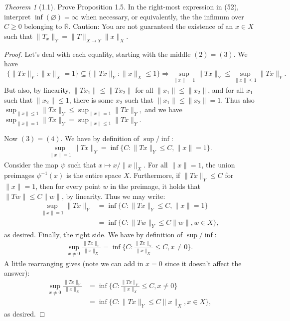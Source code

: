 \documentclass[12pt]{article}
\theoremstyle{remark}
\theoremstyle{named}
\newtheorem*{theorem}{Theorem}
\newcommand{\R}{\mathbb R}
\renewcommand{\implies}{\Rightarrow}
\begin{document}
\begin{theorem}[1.1]
    Prove Proposition 1.5. In the right-most expression in (52), interpret \(\inf(\varnothing) = \infty\) when necessary, or equivalently, the the infimum over \(C \geq 0\) belonging to \(\overline{\R}\). Caution: You are not guaranteed the existence of an \(x \in X\) such that \(\|T_x\|_Y = \|T\|_{X \to Y}\|x\|_X\).
\end{theorem}

\begin{proof}
    Let's deal with each equality, starting with the middle \((2) = (3)\). We have
    \begin{align*}
        \{\|T x\|_Y : \|x\|_X = 1\} \subseteq \{\|T x\|_Y : \|x\|_X \leq 1\} \implies \sup_{\|x\| = 1} \|T x\|_Y \leq \sup_{\|x\| \leq 1} \|T x\|_Y.
    \end{align*}
    But also, by linearity, \(\|Tx_1\| \leq \|Tx_2\|\) for all \(\|x_1\| \leq \|x_2\|\), and for all \(x_1\) such that \(\|x_2\| \leq 1\), there is some \(x_2\) such that \(\|x_1\| \leq \|x_2\| = 1\). Thus also \(\sup_{\|x\| \leq 1} \|T x\|_Y \leq \sup_{\|x\| = 1} \|T x\|_Y,\) and we have
    \(\sup_{\|x\| = 1} \|T x\|_Y = \sup_{\|x\| \leq 1} \|T x\|_Y.\)

    Now \((3) = (4)\). We have by definition of \(\sup / \inf\):
    \begin{align*}
        \sup_{\|x\| = 1} \|T x\|_Y = \inf \{C : \|T x\|_Y \leq C, \|x\| = 1\}.
    \end{align*}
    Consider the map \(\psi\) such that \(x \mapsto x / \|x\|_X\). For all \(\|x\| = 1\), the union preimages \(\psi^{-1}(x)\) is the entire space \(X\). Furthermore, if \(\|T x\|_Y \leq C\) for \(\|x\| = 1\), then for every point \(w\) in the preimage, it holds that \(\|T w\| \leq C \|w\|\), by linearity. Thus we may write:
    \begin{align*}
        \sup_{\|x\| = 1} \|T x\|_Y &= \inf \{C : \|T x\|_Y \leq C, \|x\| = 1\} \\
        &= \inf \{C : \|T w\|_Y \leq C \|w\|, w \in X\},
    \end{align*}
    as desired.
    Finally, the right side. We have by definition of \(\sup / \inf\):
    \begin{align*}
        \sup_{x \neq 0} \frac{\|T x\|_Y}{\|x\|_X} = \inf \{C : \frac{\|T x\|_Y}{\|x\|_X} \leq C, x \neq 0\}.
    \end{align*}
    A little rearranging gives (note we can add in \(x = 0\) since it doesn't affect the answer):
    \begin{align*}
        \sup_{x \neq 0} \frac{\|T x\|_Y}{\|x\|_X} &= \inf \{C : \frac{\|T x\|_Y}{\|x\|_X} \leq C, x \neq 0\} \\&= \inf \{C : \|T x\|_Y \leq C \|x\|_X, x \in X\},
    \end{align*}
    as desired.
\end{proof}
\end{document}
